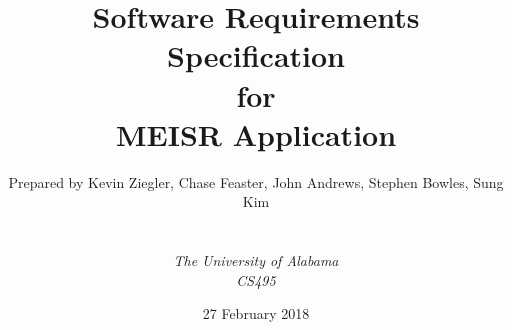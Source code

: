 \def\Institute{\textit{The University of Alabama}}
\def\Course{\textit{CS495}}

\def\BoldTitle{Software Requirements Specification}

\def\Subtitle{for \\ MEISR Application \\}
\def\Authors{Prepared by Kevin Ziegler, Chase Feaster, John Andrews, Stephen Bowles, Sung Kim}


\title{\textbf{\BoldTitle}\\\Subtitle}
\author{\Authors \\ \\ \\ \Institute\\ \Course\\}
\date{27 February 2018}

